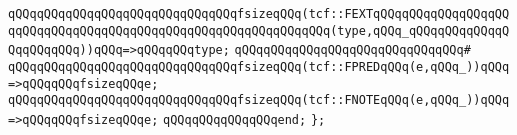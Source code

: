 \verb|qQQqqQQqqQQqqQQqqQQqqQQqqQQqqQQqfsizeqQQq(tcf::FEXTqQQqqQQqqQQqqQQqqQQqqQQqqQQqqQQqqQQqqQQqqQQqqQQqqQQqqQQqqQQqqQQq(type,qQQq_qQQqqQQqqQQqqQQqqQQqqQQq))qQQq=>qQQqqQQqtype;|\newline
\verb|qQQqqQQqqQQqqQQqqQQqqQQqqQQqqQQq#|\newline
\verb|qQQqqQQqqQQqqQQqqQQqqQQqqQQqqQQqfsizeqQQq(tcf::FPREDqQQq(e,qQQq_))qQQq=>qQQqqQQqfsizeqQQqe;|\newline
\verb|qQQqqQQqqQQqqQQqqQQqqQQqqQQqqQQqfsizeqQQq(tcf::FNOTEqQQq(e,qQQq_))qQQq=>qQQqqQQqfsizeqQQqe;|\newline
\verb|qQQqqQQqqQQqqQQqend;|\newline
\verb|};|\newline

